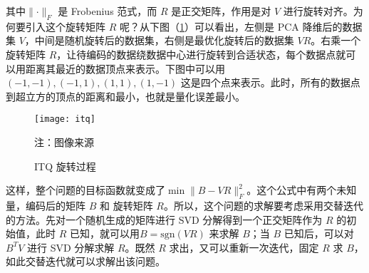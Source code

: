 其中$\lVert \cdot \rVert_F$ 是 Frobenius 范式，而 $R$ 是正交矩阵，作用是对 $V$ 进行旋转对齐。为何要引入这个旋转矩阵 $R$ 呢？从下图（\ref{fig:itq}）可以看出，左侧是 PCA 降维后的数据集 $V$，中间是随机旋转后的数据集，右侧是最优化旋转后的数据集 $VR$。右乘一个旋转矩阵 $R$，让待编码的数据绕数据中心进行旋转到合适状态，每个数据点就可以用距离其最近的数据顶点来表示。下图中可以用 $(-1, -1), (-1, 1), (1, 1), (1, -1) $ 这是四个点来表示。此时，所有的数据点到超立方的顶点的距离和最小，也就是量化误差最小。
\begin{figure}[H]
  \centering
  \texttt{[image: itq]}
  \caption{ITQ 旋转过程}
  \label{fig:itq}
  \footnotesize 注：图像来源\cite{YunchaoGong:2011:IQP:2191740.2191779}
\end{figure}
这样，整个问题的目标函数就变成了$\min \lVert B - VR \rVert_F ^2$。这个公式中有两个未知量，编码后的矩阵 $B$ 和 旋转矩阵 $R$。所以，这个问题的求解要考虑采用交替迭代的方法。先对一个随机生成的矩阵进行 SVD 分解得到一个正交矩阵作为 $R$ 的初始值，此时 $R$ 已知，就可以用$ B= \mathrm{sgn}(VR)$ 来求解 $B$；当 $B$ 已知后，可以对 $B^TV$ 进行 SVD 分解求解 $R$。既然 $R$ 求出，又可以重新一次迭代，固定 $R$ 求 $B$，如此交替迭代就可以求解出该问题。

